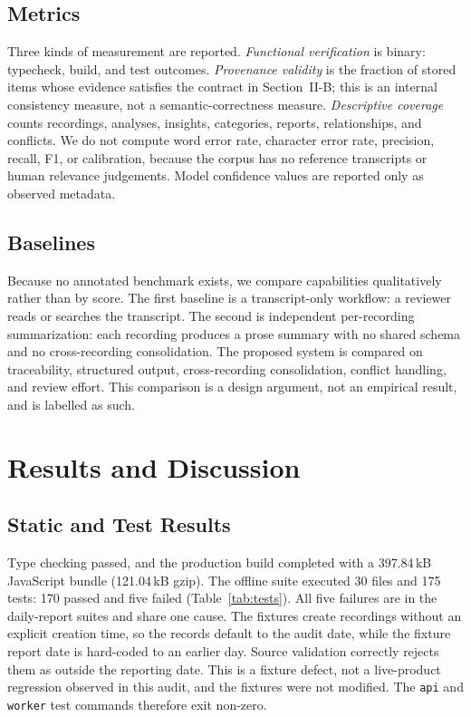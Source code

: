 \documentclass[conference,a4paper]{IEEEtran}
\newcommand{\code}[1]{\texttt{#1}}
\begin{document}
\subsection{Metrics}

Three kinds of measurement are reported. \emph{Functional verification} is binary:
typecheck, build, and test outcomes. \emph{Provenance validity} is the fraction of stored
items whose evidence satisfies the contract in Section~II-B; this is an internal
consistency measure, not a semantic-correctness measure. \emph{Descriptive coverage}
counts recordings, analyses, insights, categories, reports, relationships, and conflicts.
We do not compute word error rate, character error rate, precision, recall, F1, or
calibration, because the corpus has no reference transcripts or human relevance
judgements. Model confidence values are reported only as observed metadata.

\subsection{Baselines}

Because no annotated benchmark exists, we compare capabilities qualitatively rather than
by score. The first baseline is a transcript-only workflow: a reviewer reads or searches
the transcript. The second is independent per-recording summarization: each recording
produces a prose summary with no shared schema and no cross-recording consolidation. The
proposed system is compared on traceability, structured output, cross-recording
consolidation, conflict handling, and review effort. This comparison is a design argument,
not an empirical result, and is labelled as such.

\section{Results and Discussion}

\subsection{Static and Test Results}

Type checking passed, and the production build completed with a 397.84\,kB JavaScript
bundle (121.04\,kB gzip). The offline suite executed 30 files and 175 tests: 170 passed and
five failed (Table~\ref{tab:tests}). All five failures are in the daily-report suites and
share one cause. The fixtures create recordings without an explicit creation time, so the
records default to the audit date, while the fixture report date is hard-coded to an
earlier day. Source validation correctly rejects them as outside the reporting date. This
is a fixture defect, not a live-product regression observed in this audit, and the fixtures
were not modified. The \code{api} and \code{worker} test commands therefore exit non-zero.
\end{document}
